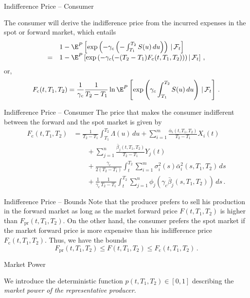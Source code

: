 {Indifference Price -- Consumer}

The consumer will derive the indifference price from the incurred expenses
in the spot or forward market, which entails
$$
\begin{array}{ll}
&1-\E^P\left[\exp\left(-\gamma_c\left(-\int_{T_1}^{T_2}S(u)\,du\right)\right)
\,|\,\mathcal{F}_t\right]\\
= &1-\E^P\left[\exp\left(-\gamma_c(-(T_2-T_1)F_{\text{c}}(t,T_1,T_2)\right))\,|\,
\mathcal{F}_t\right]\,,
\end{array}
$$
or,
\begin{equation}
F_{\text{c}}(t,T_1,T_2)=\frac1{\gamma_c}\frac1{T_2-T_1}\ln\E^P\left[
\exp\left(\gamma_c\int_{T_1}^{T_2}S(u)\,du\right)\,|\,\mathcal{F}_t\right]\,.
\end{equation}

{Indifference Price -- Consumer}
The price that makes the consumer indifferent between the forward
and the spot market is given by
\begin{align*}
F_{\text{c}}(t,T_1,T_2)&=\frac1{T_2-T_1}\int_{T_1}^{T_2}\Lambda(u)\,du
+\sum_{i=1}^m\frac{\bar{\alpha}_i(t,T_1,T_2)}{T_2-T_1}X_i(t)\\
&\qquad+\sum_{j=1}^n\frac{\bar{\beta}_j(t,T_1,T_2)}{T_2-T_1}Y_j(t) \\
&\qquad+\frac{\gamma_c}{2(T_2-T_1)}\int_t^{T_2}
\sum_{i=1}^m\sigma_i^2(s)\bar{\alpha}_i^2(s,T_1,T_2)\,ds \\
&\qquad+\frac1{\gamma_c}\frac1{T_2-T_1}\int_t^{T_2}\sum_{j=1}^n
\phi_j\left(\gamma_c\bar{\beta}_j(s,T_1,T_2)\right)\,ds\,.
\end{align*}

{Indifference Price -- Bounds}
Note that the producer prefers to sell his production in the forward
market as long as the market forward price $F(t,T_1,T_2)$ is higher
than $F_{\text{pr}}(t,T_1,T_2)$. On the other hand, the consumer
prefers the spot market if the market forward price is more
expensive than his indifference price $F_{\text{c}}(t,T_1,T_2)$.
Thus, we have the bounds
\begin{equation}\label{bounds for forward}
F_{\text{pr}}(t,T_1,T_2)\leq F(t,T_1,T_2)\leq
F_{\text{c}}(t,T_1,T_2)\,.
\end{equation}

{Market Power}






	We introduce the deterministic function $p(t,T_1,T_2)\in[0,1]$
describing the \emph{market power of the representative producer}.


